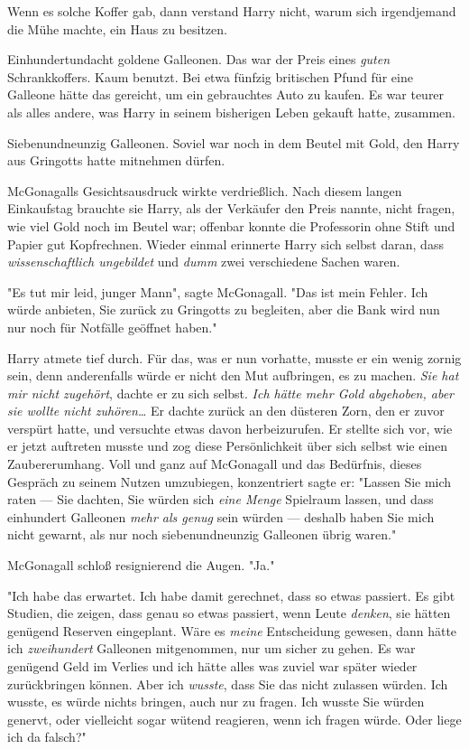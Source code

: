 {Wenn es solche Koffer gab, dann verstand Harry nicht, warum sich irgendjemand die Mühe machte, ein Haus zu besitzen.

Einhundertundacht goldene Galleonen. Das war der Preis eines \emph{guten} Schrankkoffers. Kaum benutzt. Bei etwa fünfzig britischen Pfund für eine Galleone hätte das gereicht, um ein gebrauchtes Auto zu kaufen. Es war teurer als alles andere, was Harry in seinem bisherigen Leben gekauft hatte, zusammen.

Siebenundneunzig Galleonen. Soviel war noch in dem Beutel mit Gold, den Harry aus Gringotts hatte mitnehmen dürfen.

McGonagalls Gesichtsausdruck wirkte verdrießlich. Nach diesem langen Einkaufstag brauchte sie Harry, als der Verkäufer den Preis nannte, nicht fragen, wie viel Gold noch im Beutel war; offenbar konnte die Professorin ohne Stift und Papier gut Kopfrechnen. Wieder einmal erinnerte Harry sich selbst daran, dass \emph{wissenschaftlich ungebildet} und \emph{dumm} zwei verschiedene Sachen waren.

"Es tut mir leid, junger Mann", sagte McGonagall. "Das ist mein Fehler. Ich würde anbieten, Sie zurück zu Gringotts zu begleiten, aber die Bank wird nun nur noch für Notfälle geöffnet haben."

Harry atmete tief durch. Für das, was er nun vorhatte, musste er ein wenig zornig sein, denn anderenfalls würde er nicht den Mut aufbringen, es zu machen. \emph{Sie hat mir nicht zugehört}, dachte er zu sich selbst. \emph{Ich hätte mehr Gold abgehoben, aber sie wollte nicht zuhören…} Er dachte zurück an den düsteren Zorn, den er zuvor verspürt hatte, und versuchte etwas davon herbeizurufen. Er stellte sich vor, wie er jetzt auftreten musste und zog diese Persönlichkeit über sich selbst wie einen Zaubererumhang. Voll und ganz auf McGonagall und das Bedürfnis, dieses Gespräch zu seinem Nutzen umzubiegen, konzentriert sagte er: "Lassen Sie mich raten --- Sie dachten, Sie würden sich \emph{eine Menge} Spielraum lassen, und dass einhundert Galleonen \emph{mehr als genug} sein würden --- deshalb haben Sie mich nicht gewarnt, als nur noch siebenundneunzig Galleonen übrig waren."

McGonagall schloß resignierend die Augen. "Ja."

"Ich habe das erwartet. Ich habe damit gerechnet, dass so etwas passiert. Es gibt Studien, die zeigen, dass genau so etwas passiert, wenn Leute \emph{denken}, sie hätten genügend Reserven eingeplant. Wäre es \emph{meine} Entscheidung gewesen, dann hätte ich \emph{zweihundert} Galleonen mitgenommen, nur um sicher zu gehen. Es war genügend Geld im Verlies und ich hätte alles was zuviel war später wieder zurückbringen können. Aber ich \emph{wusste}, dass Sie das nicht zulassen würden. Ich wusste, es würde nichts bringen, auch nur zu fragen. Ich wusste Sie würden genervt, oder vielleicht sogar wütend reagieren, wenn ich fragen würde. Oder liege ich da falsch?"

}
